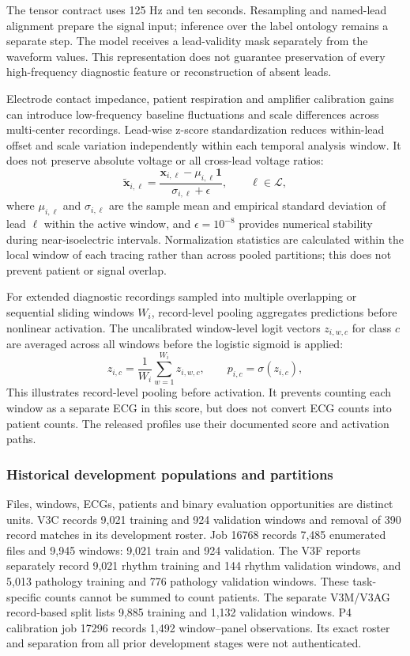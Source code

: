 \documentclass[life,article,submit,moreauthors]{Definitions/mdpi}
\begin{document}
The tensor contract uses 125 Hz and ten seconds. Resampling and named-lead alignment prepare the signal input; inference over the label ontology remains a separate step. The model receives a lead-validity mask separately from the waveform values. This representation does not guarantee preservation of every high-frequency diagnostic feature or reconstruction of absent leads.

Electrode contact impedance, patient respiration and amplifier calibration gains can introduce low-frequency baseline fluctuations and scale differences across multi-center recordings. Lead-wise z-score standardization reduces within-lead offset and scale variation independently within each temporal analysis window. It does not preserve absolute voltage or all cross-lead voltage ratios:
\begin{equation}
\tilde{\mathbf{x}}_{i,\ell}=\frac{\mathbf{x}_{i,\ell}-\mu_{i,\ell}\mathbf{1}}{\sigma_{i,\ell}+\epsilon}, \qquad \ell\in\mathcal{L},
\end{equation}
where $\mu_{i,\ell}$ and $\sigma_{i,\ell}$ are the sample mean and empirical standard deviation of lead $\ell$ within the active window, and $\epsilon = 10^{-8}$ provides numerical stability during near-isoelectric intervals. Normalization statistics are calculated within the local window of each tracing rather than across pooled partitions; this does not prevent patient or signal overlap.

For extended diagnostic recordings sampled into multiple overlapping or sequential sliding windows $W_i$, record-level pooling aggregates predictions before nonlinear activation. The uncalibrated window-level logit vectors $z_{i,w,c}$ for class $c$ are averaged across all windows before the logistic sigmoid is applied:
\begin{equation}
z_{i,c}=\frac{1}{W_i}\sum_{w=1}^{W_i} z_{i,w,c},\qquad p_{i,c}=\sigma(z_{i,c}),
\end{equation}
This illustrates record-level pooling before activation. It prevents counting each window as a separate ECG in this score, but does not convert ECG counts into patient counts. The released profiles use their documented score and activation paths.

\subsubsection{Historical development populations and partitions}
\label{sec:history}

Files, windows, ECGs, patients and binary evaluation opportunities are distinct units. V3C records 9,021 training and 924 validation windows and removal of 390 record matches in its development roster. Job 16768 records 7,485 enumerated files and 9,945 windows: 9,021 train and 924 validation. The V3F reports separately record 9,021 rhythm training and 144 rhythm validation windows, and 5,013 pathology training and 776 pathology validation windows. These task-specific counts cannot be summed to count patients. The separate V3M/V3AG record-based split lists 9,885 training and 1,132 validation windows. P4 calibration job 17296 records 1,492 window--panel observations. Its exact roster and separation from all prior development stages were not authenticated.
\end{document}
